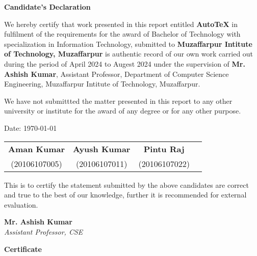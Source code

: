 \documentclass[12pt, a4paper]{article}
\begin{document}
\begin{center}
    \textbf{\Large Candidate's Declaration}
\end{center}

We hereby certify that work presented in this report entitled \textbf{AutoTeX} in fulfilment of the requirements for the award of Bachelor of Technology with specialization in Information Technology, submitted to \textbf{Muzaffarpur Intitute of Technology, Muzaffarpur} is authentic record of our own work carried out during the period of April 2024 to Augest 2024 under the supervision of \textbf{Mr. Ashish Kumar}, Assistant Professor, Department of Computer Science Engineering, Muzaffarpur Intitute of Technology, Muzaffarpur.\par

We have not submittted the matter presented in this report to any other university or institute for the award of any degree or for any other purpose.\par

\vspace{1cm}
Date: \today

\vspace{1.5cm}
\begin{table}[H]
    \centering
    \setlength{\tabcolsep}{18pt}
    \renewcommand{\arraystretch}{1.2}
    \begin{tabular}{cccc}
        \textbf{Aman Kumar} & \textbf{Ayush Kumar} & \textbf{Pintu Raj} \\
        (20106107005) & (20106107011) & (20106107022)
    \end{tabular}
\end{table}

\vspace{0.5cm}

This is to certify the statement submitted by the above candidates are correct and true to the best of our knowledge, further it is recommended for external evaluation.

\begin{space}
\vspace{2cm}
\textbf{Mr. Ashish Kumar}\\
\textit{Assistant Professor, CSE}
\end{space}

\newpage
\begin{center}
    \textbf{\Large Certificate}
\end{center}
\end{document}

